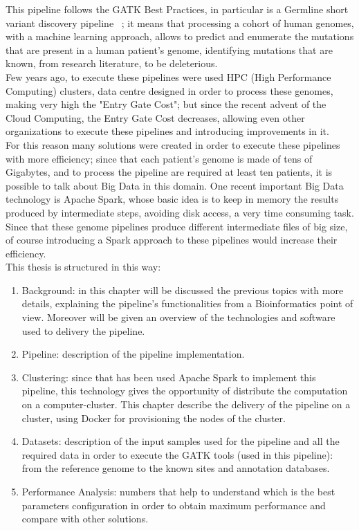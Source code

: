 This pipeline follows the GATK Best Practices, in particular is a Germline short variant discovery pipeline ~\cite{Germline}; it means that processing a cohort of human genomes, with a machine learning approach, allows  to predict and enumerate the mutations that are present in a human patient's genome, identifying mutations that are known, from research literature, to be deleterious.\\[1\baselineskip]
Few years ago, to execute these pipelines were used HPC (High Performance Computing) clusters, data centre designed in order to process these genomes, making very high the "Entry Gate Cost"; but since the recent advent of the Cloud Computing, the Entry Gate Cost decreases, allowing even other organizations to execute these pipelines and introducing improvements in it. \cite{CloudComputingGenome}
\\[1\baselineskip]
For this reason many solutions were created in order to execute these pipelines with more efficiency; since that each patient's genome is made of tens of Gigabytes, and to process the pipeline are required at least ten patients, it is possible to talk about Big Data in this domain. One recent important Big Data technology is Apache Spark, whose basic idea is to keep in memory the results produced by intermediate steps, avoiding disk access, a very time consuming task. Since that these genome pipelines produce different intermediate files of big size, of course introducing a Spark approach to these pipelines would increase their efficiency.
\\[1\baselineskip]
This thesis is structured in this way:
\begin{enumerate}
  \item Background: in this chapter will be discussed the previous topics with more details, explaining the pipeline's functionalities from a Bioinformatics point of view. Moreover will be given an overview of the technologies and software used to delivery the pipeline.
  \item Pipeline: description of the pipeline implementation.
  \item Clustering: since that has been used Apache Spark to implement this pipeline, this technology gives the opportunity of distribute the computation on a computer-cluster. This chapter describe the delivery of the pipeline on a cluster, using Docker for provisioning the nodes of the cluster.
  \item Datasets: description of the input samples used for the pipeline and all the required data in order to execute the GATK tools (used in this pipeline): from the reference genome to the known sites and annotation databases.
  \item Performance Analysis: numbers that help to understand which is the best parameters configuration in order to obtain maximum performance and compare with other solutions. 
\end{enumerate}




